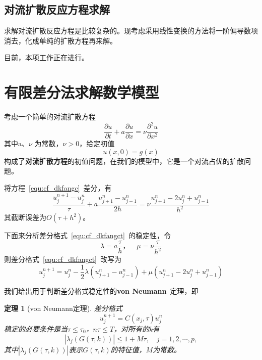 \documentclass[a4paper,cs4size,adobefonts,fancyhdr]{ctexart}[2005/11/25]
\numberwithin{equation}{section} %
\newtheorem{Theorem}[Definition]{定理}
\begin{document}
\subsection{对流扩散反应方程求解}
求解对流扩散反应方程是比较复杂的。现考虑采用线性变换的方法将一阶偏导数项消去，化成单纯的扩散方程再来解。\par
目前，本项工作正在进行。
\section{有限差分法求解数学模型}
考虑一个简单的对流扩散方程
\begin{equation}\label{equ:cf_dkfangc}
	\dfrac{\partial u}{\partial t}+a\dfrac{\partial u}{\partial x}=\nu\dfrac{\partial^2 u}{\partial x^2}
\end{equation}
其中a、$\nu$ 为常数，$\nu>0$，给定初值
\begin{equation}
	u(x,0)=g(x)
\end{equation}
构成了\textbf{对流扩散方程}的初值问题，在我们的模型中，它是一个对流占优的扩散问题。\par
将方程~\ref{equ:cf_dkfangc}~差分，有
\begin{equation}\label{equ:cf_dkfangct}
	\dfrac{u^{n+1}_j-u^{n}_{j}}{\tau}+a\dfrac{u^{n}_{j+1}-u^n_{j-1}}{2h}=\nu\dfrac{u^n_{j+1}-2u^n_j+u^n_{j-1}}{h^2}
\end{equation}
其截断误差为$O(\tau+h^2)$。\par
下面来分析差分格式~\ref{equ:cf_dkfangct}~的稳定性，令
\begin{equation}
	\lambda = a\dfrac{\tau}{h}，\quad\mu=\nu\dfrac{\tau}{h^2}
\end{equation}
则差分格式~\ref{equ:cf_dkfangct}~改写为
\begin{equation}\label{equ:cf_dkmmm}
u^{n+1}_j=u^n_j-\frac{1}{2}\lambda(u^n_{j+1}-u^n_{j-1})+\mu(u^n_{j+1}-2u^n_j+u^n_{j-1})
\end{equation}\par
我们给出用于判断差分格式稳定性的\textbf{von Neumann}~定理，即
\begin{Theorem}[von Neumann定理]
差分格式
\begin{equation}
	u^{n+1}_j=C(x_j,\tau)u^n_j
\end{equation}
稳定的必要条件是当$\tau\leq\tau_0$，$n\tau\leq T$，对所有的k有
\begin{equation}
	\left|\lambda_j(G(\tau,k))\right| \leq 1+M\tau,\quad j=1,2,\cdots,p,
\end{equation}
其中$\left|\lambda_j(G(\tau,k))\right|$表示$G(\tau,k)$的特征值，$M$为常数。
\end{Theorem}\par
\end{document}
